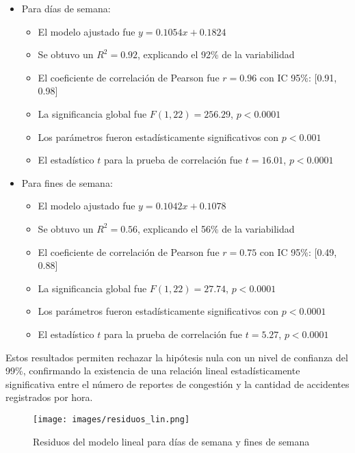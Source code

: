 \documentclass[12pt]{article}
\begin{document}
\begin{itemize}
    \item Para días de semana:
    \begin{itemize}
        \item El modelo ajustado fue $y = 0.1054x + 0.1824$
        \item Se obtuvo un $R^2 = 0.92$, explicando el 92\% de la variabilidad
        \item El coeficiente de correlación de Pearson fue $r = 0.96$ con IC 95\%: [0.91, 0.98]
        \item La significancia global fue $F(1, 22) = 256.29$, $p < 0.0001$
        \item Los parámetros fueron estadísticamente significativos con $p < 0.001$
        \item El estadístico $t$ para la prueba de correlación fue $t = 16.01$, $p < 0.0001$
    \end{itemize}

    \item Para fines de semana:
    \begin{itemize}
        \item El modelo ajustado fue $y = 0.1042x + 0.1078$
        \item Se obtuvo un $R^2 = 0.56$, explicando el 56\% de la variabilidad
        \item El coeficiente de correlación de Pearson fue $r = 0.75$ con IC 95\%: [0.49, 0.88]
        \item La significancia global fue $F(1, 22) = 27.74$, $p < 0.0001$
        \item Los parámetros fueron estadísticamente significativos con $p < 0.0001$
        \item El estadístico $t$ para la prueba de correlación fue $t = 5.27$, $p < 0.0001$
    \end{itemize}
\end{itemize}

Estos resultados permiten rechazar la hipótesis nula con un nivel de confianza del 99\%, confirmando la existencia de una relación lineal estadísticamente significativa entre el número de reportes de congestión y la cantidad de accidentes registrados por hora.

\begin{figure}[H]
\centering
\texttt{[image: images/residuos\_lin.png]}
\caption{Residuos del modelo lineal para días de semana y fines de semana}
\label{fig:resid_lin}
\end{figure}
\end{document}
